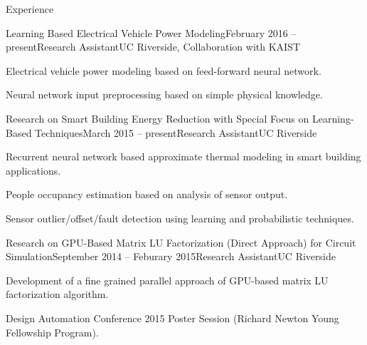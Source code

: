 \documentclass{resume} %
\begin{document}

\begin{rSection}{Experience}

    \begin{rSubsection}{Learning Based Electrical Vehicle Power Modeling}{February 2016 -- present}{Research Assistant}{UC Riverside, Collaboration with KAIST}

    \item Electrical vehicle power modeling based on feed-forward neural
        network.

    \item Neural network input preprocessing based on simple physical
        knowledge.

    \end{rSubsection}

    \begin{rSubsection}{Research on Smart Building Energy Reduction with Special Focus on Learning-Based Techniques}{March 2015 -- present}{Research Assistant}{UC Riverside}

    \item Recurrent neural network based approximate thermal modeling in smart
        building applications.

    \item People occupancy estimation based on analysis of sensor output.

    \item Sensor outlier/offset/fault detection using learning and
        probabilistic techniques.

    \end{rSubsection}

    \begin{rSubsection}{Research on GPU-Based Matrix LU Factorization (Direct Approach) for Circuit Simulation}{September 2014 -- Feburary 2015}{Research Assistant}{UC Riverside}

    \item Development of a fine grained parallel approach of GPU-based matrix
        LU factorization algorithm.

    \item Design Automation Conference 2015 Poster Session (Richard Newton
        Young Fellowship Program).

    \end{rSubsection}



\end{rSection}
\end{document}
